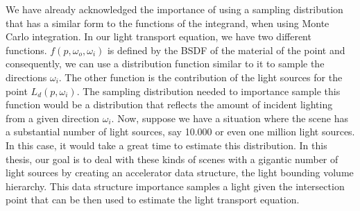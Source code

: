 We have already acknowledged the importance of using a sampling distribution that has a similar form to the functions of the integrand, when using Monte Carlo integration. In our light transport equation, we have two different functions. $f(p, \omega_o, \omega_i)$ is defined by the BSDF of the material of the point and consequently, we can use a distribution function similar to it to sample the directions $\omega_i$. The other function is the contribution of the light sources for the point $L_d(p, \omega_i)$. The sampling distribution needed to importance sample this function would be a distribution that reflects the amount of incident lighting from a given direction $\omega_i$. Now, suppose we have a situation where the scene has a substantial number of light sources, say 10.000 or even one million light sources. In this case, it would take a great time to estimate this distribution. In this thesis, our goal is to deal with these kinds of scenes with a gigantic number of light sources by creating an accelerator data structure, the light bounding volume hierarchy. This data structure importance samples a light given the intersection point that can be then used to estimate the light transport equation.